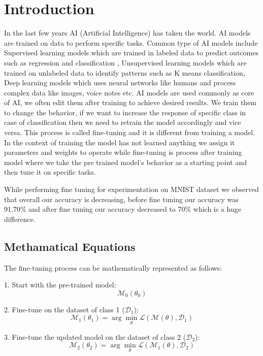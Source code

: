 \documentclass[conference]{IEEEtran}
\begin{document}
\section{Introduction}
In the last few years AI (Artificial Intelligence) has taken the world. AI models are trained on data to perform specific tasks. Common type of AI models include Supervised learning models which are trained in labeled data to predict outcomes such as regression and classification , Unsupervised learning models  which are trained on unlabeled data to identify patterns such as K means classification, Deep learning models which uses neural networks like humans and process complex data like images, voice notes etc. AI models are used commonly as core of AI, we often edit them after training to achieve desired results. We train them to change the behavior, if we want to increase the response of specific class in case of classification then we need to retrain the model accordingly and vice versa. This process is called fine-tuning and it is different from training a model. In the context of training the model has not learned anything we assign it parameters and weights to operate while fine-tuning is process after training model where we take the pre trained model’s behavior as a starting point and then tune it on specific tasks. 

While performing fine tuning for experimentation on MNIST dataset we observed that overall our accuracy is decreasing, before fine tuning our accuracy was 91.70\% and after fine tuning our accuracy decreased to 70\% which is a huge difference.


\subsection{Methamatical Equations}
The fine-tuning process can be mathematically represented as follows:

1. Start with the pre-trained model:
\begin{equation}
\mathcal{M}_0(\theta_0)
\end{equation}

2. Fine-tune on the dataset of class 1 (\( \mathcal{D}_1 \)):
\begin{equation}
\mathcal{M}_1(\theta_1) = \arg \min_{\theta} \mathcal{L}(\mathcal{M}(\theta), \mathcal{D}_1)
\end{equation}

3. Fine-tune the updated model on the dataset of class 2 (\( \mathcal{D}_2 \)):
\begin{equation}
\mathcal{M}_2(\theta_2) = \arg \min_{\theta} \mathcal{L}(\mathcal{M}_1(\theta), \mathcal{D}_2)
\end{equation}
\end{document}

